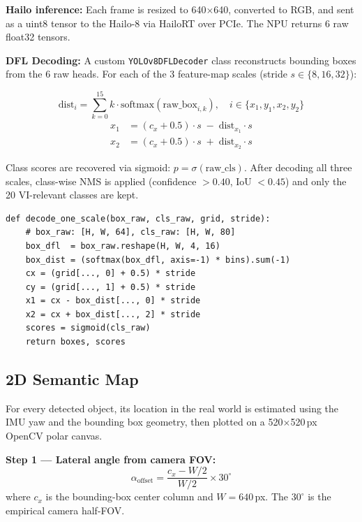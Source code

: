 \documentclass[journal, onecolumn]{IEEEtran}
\begin{document}
\textbf{Hailo inference:} Each frame is resized to 640$\times$640, converted to RGB, and sent as a uint8 tensor to the Hailo-8 via HailoRT over PCIe. The NPU returns 6 raw float32 tensors.

\textbf{DFL Decoding:} A custom \texttt{YOLOv8DFLDecoder} class reconstructs bounding boxes from the 6 raw heads. For each of the 3 feature-map scales (stride $s \in \{8, 16, 32\}$):

\begin{equation}
  \text{dist}_{i} = \sum_{k=0}^{15} k \cdot \text{softmax}(\text{raw\_box}_{i,k}), \quad i \in \{x_1, y_1, x_2, y_2\}
  \label{eq:dfl}
\end{equation}
\begin{align}
  x_1 &= (c_x + 0.5)\cdot s \;-\; \text{dist}_{x_1} \cdot s \\
  x_2 &= (c_x + 0.5)\cdot s \;+\; \text{dist}_{x_2} \cdot s
\end{align}

Class scores are recovered via sigmoid: $p = \sigma(\text{raw\_cls})$. After decoding all three scales, class-wise NMS is applied (confidence $> 0.40$, IoU $< 0.45$) and only the 20 VI-relevant classes are kept.

\begin{lstlisting}[caption={DFL decode for one feature-map scale (core logic)},label=lst:dfl]
def decode_one_scale(box_raw, cls_raw, grid, stride):
    # box_raw: [H, W, 64], cls_raw: [H, W, 80]
    box_dfl  = box_raw.reshape(H, W, 4, 16)
    box_dist = (softmax(box_dfl, axis=-1) * bins).sum(-1)
    cx = (grid[..., 0] + 0.5) * stride
    cy = (grid[..., 1] + 0.5) * stride
    x1 = cx - box_dist[..., 0] * stride
    x2 = cx + box_dist[..., 2] * stride
    scores = sigmoid(cls_raw)
    return boxes, scores
\end{lstlisting}

\subsection{2D Semantic Map}
\label{sec:map}

For every detected object, its location in the real world is estimated using the IMU yaw and the bounding box geometry, then plotted on a 520$\times$520\,px OpenCV polar canvas.

\textbf{Step 1 — Lateral angle from camera FOV:}
\begin{equation}
  \alpha_\text{offset} = \frac{c_x - W/2}{W/2} \times 30^\circ
\end{equation}
where $c_x$ is the bounding-box center column and $W = 640$\,px. The $30^\circ$ is the empirical camera half-FOV.
\end{document}
